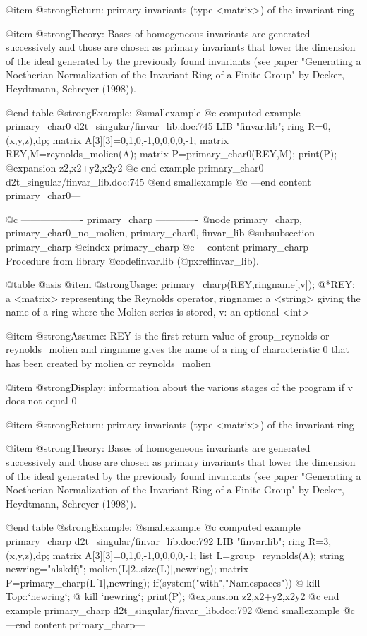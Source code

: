 @item @strong{Return:}
primary invariants (type <matrix>) of the invariant ring

@item @strong{Theory:}
Bases of homogeneous invariants are generated successively and those
are chosen as primary invariants that lower the dimension of the ideal
generated by the previously found invariants (see paper "Generating a
Noetherian Normalization of the Invariant Ring of a Finite Group" by
Decker, Heydtmann, Schreyer (1998)).

@end table
@strong{Example:}
@smallexample
@c computed example primary_char0 d2t_singular/finvar_lib.doc:745 
LIB "finvar.lib";
ring R=0,(x,y,z),dp;
matrix A[3][3]=0,1,0,-1,0,0,0,0,-1;
matrix REY,M=reynolds_molien(A);
matrix P=primary_char0(REY,M);
print(P);
@expansion{} z2,x2+y2,x2y2
@c end example primary_char0 d2t_singular/finvar_lib.doc:745
@end smallexample
@c ---end content primary_char0---

@c ------------------- primary_charp -------------
@node primary_charp, primary_char0_no_molien, primary_char0, finvar_lib
@subsubsection primary_charp
@cindex primary_charp
@c ---content primary_charp---
Procedure from library @code{finvar.lib} (@pxref{finvar_lib}).

@table @asis
@item @strong{Usage:}
primary_charp(REY,ringname[,v]);
@*REY: a <matrix> representing the Reynolds operator, ringname: a
<string> giving the name of a ring where the Molien series is stored,
v: an optional <int>

@item @strong{Assume:}
REY is the first return value of group_reynolds or reynolds_molien and
ringname gives the name of a ring of characteristic 0 that has been
created by molien or reynolds_molien

@item @strong{Display:}
information about the various stages of the program if v does not
equal 0

@item @strong{Return:}
primary invariants (type <matrix>) of the invariant ring

@item @strong{Theory:}
Bases of homogeneous invariants are generated successively and those
are chosen as primary invariants that lower the dimension of the ideal
generated by the previously found invariants (see paper "Generating a
Noetherian Normalization of the Invariant Ring of a Finite Group" by
Decker, Heydtmann, Schreyer (1998)).

@end table
@strong{Example:}
@smallexample
@c computed example primary_charp d2t_singular/finvar_lib.doc:792 
LIB "finvar.lib";
ring R=3,(x,y,z),dp;
matrix A[3][3]=0,1,0,-1,0,0,0,0,-1;
list L=group_reynolds(A);
string newring="alskdfj";
molien(L[2..size(L)],newring);
matrix P=primary_charp(L[1],newring);
if(system("with","Namespaces")) @{ kill Top::`newring`; @}
kill `newring`;
print(P);
@expansion{} z2,x2+y2,x2y2
@c end example primary_charp d2t_singular/finvar_lib.doc:792
@end smallexample
@c ---end content primary_charp---

